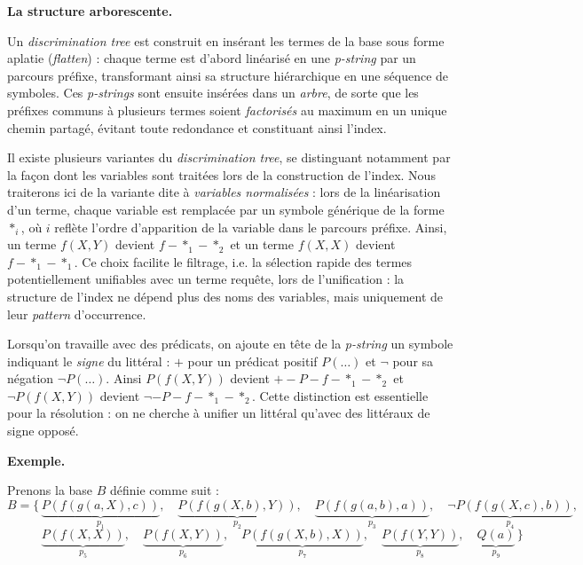 \documentclass[11pt]{article}
\begin{document}
\vspace{0.4cm}
\noindent\textbf{La structure arborescente.}
\vspace{0.4cm}

Un \textit{discrimination tree} est construit en insérant les termes de la 
base sous forme aplatie (\textit{flatten}) : chaque terme est d'abord 
linéarisé en une \textit{p-string} par un parcours préfixe, transformant ainsi 
sa structure hiérarchique en une séquence de symboles. Ces \textit{p-strings} 
sont ensuite insérées dans un \textit{arbre}, de sorte que les préfixes communs 
à plusieurs termes soient \textit{factorisés} au maximum en un unique chemin 
partagé, évitant toute redondance et constituant ainsi l'index.

\vspace{0.2cm}
Il existe plusieurs variantes du \textit{discrimination tree}, se distinguant 
notamment par la façon dont les variables sont traitées lors de la construction 
de l'index. Nous traiterons ici de la variante dite à \textit{variables 
normalisées} : lors de la linéarisation d'un terme, chaque variable est 
remplacée par un symbole générique de la forme $*_i$, où $i$ reflète l'ordre 
d'apparition de la variable dans le parcours préfixe. Ainsi, un terme 
$f(X, Y)$ devient $f-{*_1}-{*_2}$ et un terme $f(X, X)$ 
devient $f-{*_1}-{*_1}$. Ce choix facilite le filtrage, i.e. la sélection rapide des termes potentiellement unifiables avec un terme requête, lors 
de l'unification : la structure de l'index ne dépend plus des noms des 
variables, mais uniquement de leur \textit{pattern} d'occurrence.

\vspace{0.2cm}
Lorsqu'on travaille avec des prédicats, on ajoute en tête de la \textit{p-string} un 
symbole indiquant le \textit{signe} du littéral : $+$ pour un prédicat positif 
$P(\ldots)$ et $\neg$ pour sa négation $\neg P(\ldots)$. Ainsi $P(f(X, Y))$ 
devient $+-P-f-{*_1}-{*_2}$ et $\neg P(f(X, Y))$ 
devient $\neg-P-f-{*_1}-{*_2}$. Cette distinction 
est essentielle pour la résolution : on ne cherche à unifier un littéral 
qu'avec des littéraux de signe opposé.

\vspace{0.4cm}
\noindent\textbf{Exemple.}
\vspace{0.4cm}

\vspace{0.2cm}

Prenons la base $B$ définie comme suit :
\[
B = \bigl\{\,
    \underbrace{P(f(g(a, X), c))}_{p_1},\quad
    \underbrace{P(f(g(X, b), Y))}_{p_2},\quad
    \underbrace{P(f(g(a, b), a))}_{p_3},\quad
    \underbrace{\neg P(f(g(X, c), b))}_{p_4},
\]
\[
    \phantom{B = \bigl\{\,}
    \underbrace{P(f(X, X))}_{p_5},\quad
    \underbrace{P(f(X, Y))}_{p_6},\quad
    \underbrace{P(f(g(X, b), X))}_{p_7},\quad
    \underbrace{P(f(Y, Y))}_{p_8}, \quad
    \underbrace{Q(a)}_{p_9}
\,\bigr\}
\]
\end{document}
